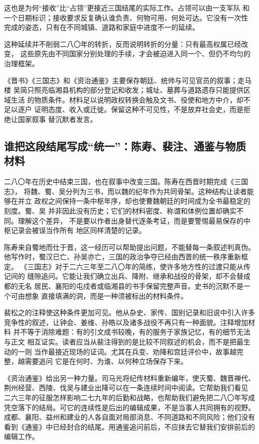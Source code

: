 这也是为何“接收”比“占领”更接近三国结尾的实际工作。占领可以由一支军队
和一个日期标识；接收要求反复确认谁负责、何物可用、何处可达。它没有一次性
完成的姿态，只有在不同城镇、道路和家庭中进度不一的延续。

这种延续并不削弱二八〇年的转折，反而说明转折的分量：只有最高权属已经改变，
这些原先由不同国家分别处理的手续，才会被迫进入同一个、但仍不均匀的治理框架。

\begin{sourcenote}
《晋书》《三国志》和《资治通鉴》主要保存朝廷、统帅与可见官员的叙事；走马楼
吴简只照亮临湘县机构的部分登记和收发；城址、墓葬与道路遗存只能提供区域生活
的物质条件。材料足以说明政权转换会触及文书、役使和地方中介，却不足以逐户
证明态度、收入或迁徙。保留这种不可见性，不是放弃社会史，而是拒绝让国家叙事
替沉默者发言。
\end{sourcenote}

\subsection{谁把这段结尾写成“统一”：陈寿、裴注、通鉴与物质材料}

二八〇年在历史中结束三国，也在叙事中改变三国。陈寿在西晋时期完成《三国志》，
将魏、蜀、吴分列为三书，而以魏的纪年作为共同骨架。这种结构让读者能够在并立
政权之间保持一条中枢年序，却也使曹魏朝廷的时间成为全书最稳定的刻度。蜀、吴
并非因此没有历史；它们的材料密度、称谓和体例位置却确实不同。理解这个差异，
不是要以作者出身替代逐条考证，而是要警惕最易保存的中枢记录会被误当作所有
地区同样清楚的记录。

陈寿来自蜀地而仕于晋，这一经历可以帮助提出问题，不能替每一条叙述判真伪。
他写作时，蜀汉已亡、孙吴亦亡，三国的政治争夺已经由西晋的统一秩序重新框定。
《三国志》对于二六三年至二八〇年的简练，使许多地方性的过渡只能从传记间的
缝隙追问。它能让我们确立出兵、降附、继承和战役的骨架，却不会替成都的无名
居民、襄阳的屯戍者或临湘县的书手保留完整声音。史书的沉默不是一个可由想象
直接填满的洞，而是一种须被标出的材料条件。

裴松之的注释使这种条件更加可见。他从杂史、家传、国别记录和旧说中引入许多
竞争性的叙述，让钟会、姜维、孙皓以及诸多战役不再只有一种面貌。注释增加材料
并不等于消除难题：有的引文成书较晚，有的服务于家族记忆，有的细节无法与正文
相互证实。读者应当从裴注得到的是比较不同叙述的机会，而不是把最生动的一则
当作最接近现场的证词。尤其在兵变、劝降和宫廷评价中，故事越完整，越需要追问
它是在何时、为谁、以何种立场保存下来。

《资治通鉴》给出另一种力量。司马光将纪传材料重新编年，使灭蜀、魏晋禅代、
荆州经营、西陵、伐吴与建业出降可以在一条连续时间中阅读。它帮助我们看见
二六三年的征服怎样影响二七九年的后勤和战略，也帮助我们避免把二八〇年写成
凭空落下的结局。可它的连续性是后出的编辑成果，不是当事人共同拥有的视野。
成都、襄阳、益州和建业的人各自面对局部消息、不同道路和不同风险；他们没有
看到《通鉴》中已经封合的结尾。用通鉴追问前后，不应抹去它替我们安排前后的
编辑工作。

